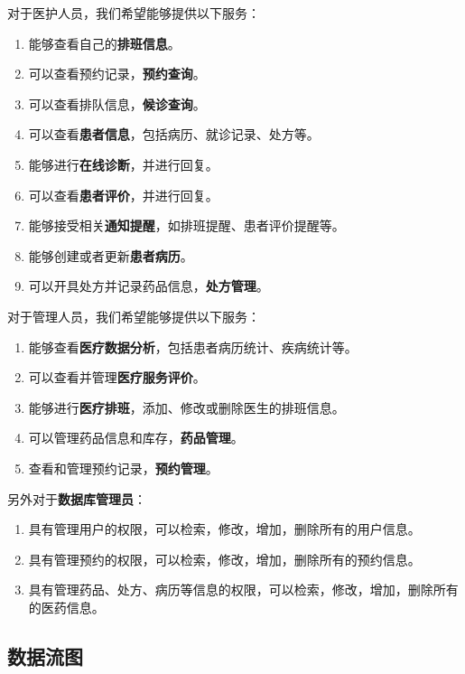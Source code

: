 \documentclass{article}
\begin{document}
\vspace{0.5cm}
对于医护人员，我们希望能够提供以下服务：
\begin{enumerate}[itemsep=0.01em]
    \item 能够查看自己的\textbf{排班信息}。
    \item 可以查看预约记录，\textbf{预约查询}。
    \item 可以查看排队信息，\textbf{候诊查询}。
    \item 可以查看\textbf{患者信息}，包括病历、就诊记录、处方等。
    \item 能够进行\textbf{在线诊断}，并进行回复。
    \item 可以查看\textbf{患者评价}，并进行回复。
    \item 能够接受相关\textbf{通知提醒}，如排班提醒、患者评价提醒等。
    \item 能够创建或者更新\textbf{患者病历}。
    \item 可以开具处方并记录药品信息，\textbf{处方管理}。
\end{enumerate}

\vspace{0.5cm}
对于管理人员，我们希望能够提供以下服务：
\begin{enumerate}[itemsep=0.01em]
    \item 能够查看\textbf{医疗数据分析}，包括患者病历统计、疾病统计等。
    \item 可以查看并管理\textbf{医疗服务评价}。
    \item 能够进行\textbf{医疗排班}，添加、修改或删除医生的排班信息。
    \item 可以管理药品信息和库存，\textbf{药品管理}。
    \item 查看和管理预约记录，\textbf{预约管理}。
\end{enumerate}

\vspace{0.5cm}
另外对于\textbf{数据库管理员}：
\begin{enumerate}[itemsep=0.01em]
    \item 具有管理用户的权限，可以检索，修改，增加，删除所有的用户信息。
    \item 具有管理预约的权限，可以检索，修改，增加，删除所有的预约信息。
    \item 具有管理药品、处方、病历等信息的权限，可以检索，修改，增加，删除所有的医药信息。
\end{enumerate}

\subsection{数据流图}
\end{document}
